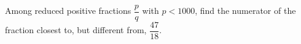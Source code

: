 Among reduced positive fractions $\dfrac{p}{q}$ with $p<1000$, find the numerator of the fraction closest to, but different from, $\dfrac{47}{18}$.
